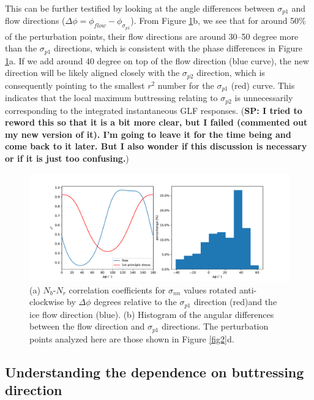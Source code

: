 \documentclass[review,oneside]{igs}
\begin{document}
This can be further testified by looking at the angle differences between $\sigma_{p1}$ and flow directions ($\Delta \phi = \phi_{flow}-\phi_{\sigma_{p1}}$). From Figure \ref{fig3}b, we see that for around 50\% of the perturbation points, their flow directions are around 30--50 degree more than the $\sigma_{p1}$ directions, which is consistent with the phase differences in Figure \ref{fig3}a. If we add around 40 degree on top of the flow direction (blue curve), the new direction will be likely aligned closely with the $\sigma_{p2}$ direction, which is consequently pointing to the smallest $r^2$ number for the $\sigma_{p1}$ (red) curve. This indicates that the local maximum buttressing relating to $\sigma_{p2}$ is unnecessarily corresponding to the integrated instantaneous GLF responses. (\textbf{SP: I tried to reword this so that it is a bit more clear, but I failed (commented out my new version of it). I'm going to leave it for the time being and come back to it later. But I also wonder if this discussion is necessary or if it is just too confusing.})

\begin{figure}
\centering
\includegraphics[width=1\linewidth]{figs/fig3.pdf}
    \caption{(a) $N_b$-$N_r$ correlation coefficients for $\sigma_{nn}$ values rotated anti-clockwise by $\Delta\phi$ degrees relative to the $\sigma_{p1}$ direction (red)and the ice flow direction (blue). (b) Histogram of the angular differences between the flow direction and $\sigma_{p1}$ directions. The perturbation points analyzed here are those shown in Figure \ref{fig2}d.}
    \label{fig3}
\end{figure}

\subsection{Understanding the dependence on buttressing direction}
\end{document}
